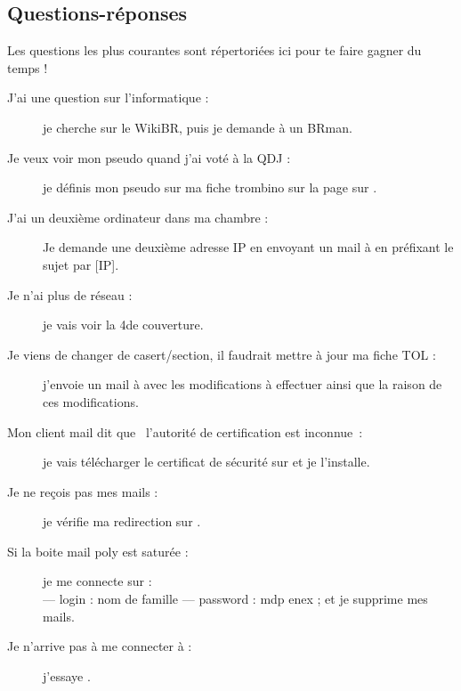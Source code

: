 \subsection{Questions-réponses}

Les questions les plus courantes sont répertoriées ici pour te faire gagner du temps !

\begin{description}

\item[J'ai une question sur l'informatique : ] je cherche sur le WikiBR, puis je demande \`a un BRman.

\item[Je veux voir mon pseudo quand j'ai voté à la QDJ : ] je définis mon pseudo sur ma fiche \linebreak trombino sur la page  sur \fkz.

\item[J'ai un deuxième ordinateur dans ma chambre : ] Je demande une deuxième adresse IP en envoyant un mail à 
en préfixant le sujet par [IP].

\item[Je n'ai plus de réseau : ] je vais voir la 4\ieme de couverture.

\item[Je viens de changer de casert/section, il faudrait mettre à jour ma fiche TOL : ] j'envoie un \newline mail à  avec les modifications à effectuer
ainsi que la raison de ces modifications.

\item[Mon client mail dit que \guillemotleft~l'autorité de certification est inconnue~\guillemotright : ] je vais télécharger le certificat de sécurité
sur  et je l'installe.

\item[Je ne reçois pas mes mails : ] je vérifie ma redirection sur .

\item[Si la boite mail poly est saturée : ] je me connecte sur :\\
 --- login : nom de famille ---
password : mdp enex ; et je supprime mes mails.


\item[Je n'arrive pas à me connecter à  : ] j'essaye .


\end{description}
